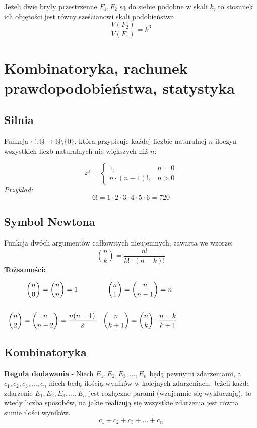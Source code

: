 \documentclass[14pt,a4paper]{extarticle}
\begin{document}
\noindent Jeżeli dwie bryły przestrzenne $F_{1}, F_{2}$ są do siebie podobne w skali $k$, to stosunek
ich objętości jest równy sześcianowi skali podobieństwa.
$$\dfrac{V(F_{2})}{V(F_{1})}=k^{3}$$

\newpage
\section{Kombinatoryka, rachunek prawdopodobieństwa, statystyka}
\subsection{Silnia} Funkcja $\cdot\: !: \mathbb{N} \rightarrow \mathbb{N}\setminus\{0\}$, która przypisuje każdej
liczbie naturalnej $n$ iloczyn wszystkich liczb naturalnych nie większych niż $n$:

\begin{equation*}
   x! = \left\{
      \begin{array}{ll}
         1, & n = 0 \\
         n\cdot (n-1)!, & n > 0
      \end{array}
   \right.
\end{equation*}
\noindent \textit{Przykład:}
$$6! = 1\cdot 2\cdot 3\cdot 4\cdot 5\cdot 6 = 720$$

\subsection{Symbol Newtona}
Funkcja dwóch argumentów całkowitych nieujemnych, zawarta we wzorze:
$$\binom{n}{k} = \dfrac{n!}{k!\cdot (n-k)!}$$
\noindent\textbf{Tożsamości:}
\begin{center}
   \(
   \begin{array}{cc}
      \dbinom{n}{0} = \dbinom{n}{n} = 1 & \dbinom{n}{1} = \dbinom{n}{n-1} = n\\[0.9cm]
      \dbinom{n}{2} = \dbinom{n}{n-2} = \dfrac{n(n-1)}{2} & \dbinom{n}{k+1} = \dbinom{n}{k}\cdot \dfrac{n-k}{k+1}\\
   \end{array}
   \)

\end{center}

\subsection{Kombinatoryka}
\noindent\textbf{Reguła dodawania} - Niech $E_{1}, E_{2}, E_{3}, \dots, E_{n}$ będą pewnymi zdarzeniami,
a $c_{1}, c_{2}, c_{3},\dots, c_{n}$ niech będą ilością wyników w kolejnych zdarzeniach. Jeżeli każde zdarzenie
$E_{1}, E_{2}, E_{3}, \dots, E_{n}$ jest rozłączne parami (wzajemnie się wykluczają), to wtedy liczba sposobów,
na jakie realizują się wszystkie zdarzenia jest równa sumie ilości wyników.
\[c_{1} + c_{2} + c_{3} + \ldots + c_{n} \]
\end{document}
